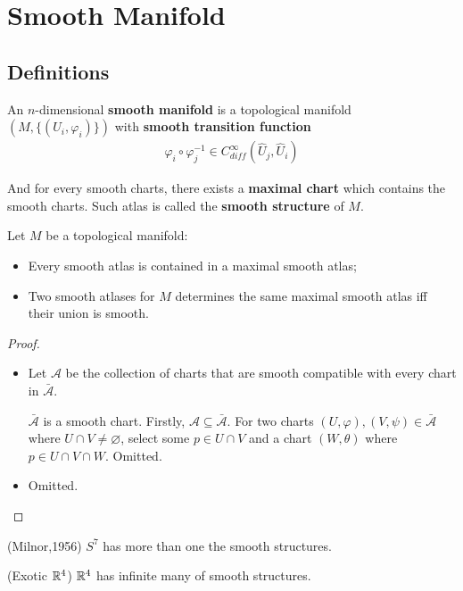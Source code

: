 \documentclass[Total.tex]{subfiles}
\begin{document}
	\chapter{Smooth Manifold}
		\section{Definitions}
			\begin{Def}
				An $n$-dimensional \textbf{smooth manifold} is a topological manifold $(M,\{(U_i,\varphi_i)\})$ with \textbf{smooth transition function}
				\begin{gather*}
					\varphi_i\circ\varphi_j^{-1}\in C^\infty_{diff}(\hat{U}_j,\hat{U}_i)
				\end{gather*}
			\end{Def}
			And for every smooth charts, there exists a \textbf{maximal chart} which contains the smooth charts. Such atlas is called the \textbf{smooth structure} of $M$.
			
			\begin{lemma} Let $M$ be a topological manifold:
				\begin{itemize}
					\item Every smooth atlas is contained in a maximal smooth atlas;
					\item Two smooth atlases for $M$ determines the same maximal smooth atlas iff their union is smooth.
				\end{itemize}
			\end{lemma}
			\begin{proof}
				\begin{itemize}
					\item Let $\mathcal{A}$ be the collection of charts that are smooth compatible with every chart in $\bar{\mathcal{A}}$. 
					
					 $\bar{\mathcal{A}}$ is a smooth chart. Firstly, $\mathcal{A}\subseteq \bar{\mathcal{A}}$. For two charts $(U,\varphi),(V,\psi)\in \bar{\mathcal{A}}$ where $U\cap V\not=\varnothing$, select some $p\in U\cap V$ and a chart $(W,\theta)$ where $p\in U\cap V\cap W$. Omitted.
					\item Omitted.
				\end{itemize}
			\end{proof}
			
			\begin{theorem}
				(Milnor,1956) $S^7$ has more than one the smooth structures.
			\end{theorem}
			\begin{theorem}
				(Exotic $\mathbb{R}^4$) $\mathbb{R}^4$ has infinite many of smooth structures.
			\end{theorem}
			
\end{document}
